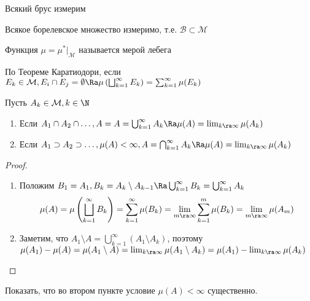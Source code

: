 \begin{corollary}
    Всякий брус измерим
\end{corollary}

\begin{corollary}
    Всякое борелевское множество измеримо, т.е. \(\mathcal{B} \subset \mathcal{M}\)
\end{corollary}

\begin{definition}
    Функция \(\mu = \mu^*|_{\mathcal{M}}\) называется мерой лебега
\end{definition}

\begin{note}
    По Теореме Каратиодори, если \(E_k \in \mathcal{M}, E_i \cap E_j = \emptyset \Ra \mu\left(\bigsqcup_{k = 1}^\infty E_k\right) = \sum_{k = 1}^\infty \mu(E_k)\)
\end{note}

\begin{theorem}
    Пусть \(A_k \in \mathcal{M}, k \in \N\)
    \begin{enumerate}
        \item Если \(A_1 \cap A_2 \cap \dots, A = A = \bigcup_{k = 1}^\infty A_k \Ra \mu(A) = \lim_{k \ra \infty} \mu(A_k)\)
        \item Если \(A_1 \supset A_2 \supset \dots, \mu(A) < \infty, A = \bigcap_{k = 1}^\infty A_k \Ra \mu(A) = \lim_{k \ra \infty} \mu(A_k)\)
    \end{enumerate}
\end{theorem}
\begin{proof}\indent
    \begin{enumerate}
        \item Положим \(B_1 = A_1, B_k = A_k \setminus A_{k - 1} \Ra \bigcup_{k = 1}^\infty B_k = \bigcup_{k = 1}^\infty A_k\)
        \[\mu(A) = \mu\left(\bigsqcup_{k = 1}^\infty B_k\right) = \sum_{k = 1}^\infty \mu(B_k) = \lim_{m \ra \infty} \sum_{k = 1}^m \mu(B_k) = \lim_{m \ra \infty} \mu(A_m)\]
        \item Заметим, что \(A_1 \setminus A = \bigcup_{k  =1}^\infty (A_1 \setminus A_k)\), поэтому \(\mu(A_1) - \mu(A) = \mu(A_1 \setminus A) = \lim_{k \ra \infty}\mu(A_1 \setminus A_k) = \mu(A_1) - \lim_{k \ra \infty} \mu(A_k)\)
    \end{enumerate}
\end{proof}

\begin{exercise}
    Показать, что во втором пункте условие \(\mu(A) < \infty\) существенно.
\end{exercise}


